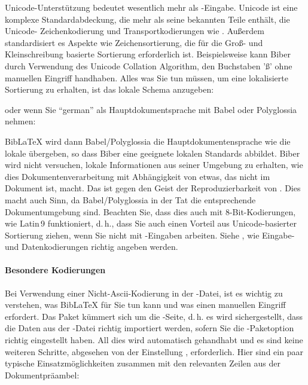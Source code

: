 \documentclass{ltxdockit}[2011/03/25]
\newcommand*{\biber}{Biber\xspace}
\newcommand*{\biblatex}{BibLaTeX\xspace}
\begin{document}
Unicode-Unterstützung bedeutet wesentlich mehr als \utf-Eingabe. Unicode ist
eine komplexe Standardabdeckung, die mehr als seine bekannten Teile enthält, die
Unicode- Zeichenkodierung und Transportkodierungen wie \utf. Außerdem
standardisiert es Aspekte wie Zeichensortierung, die für die Groß- und
Kleinschreibung basierte Sortierung erforderlich ist. Beispielsweise kann Biber
durch Verwendung des Unicode Collation Algorithm, den Buchstaben 'ß' ohne manuellen Eingriff handhaben. Alles was Sie
tun müssen, um eine lokalisierte Sortierung zu erhalten, ist das lokale
Schema anzugeben:

\begin{ltxexample}
\usepackage[sortlocale=de]{biblatex}
\end{ltxexample}
%
oder wenn Sie "`german"' als Hauptdokumentsprache mit Babel oder Polyglossia nehmen:

\begin{ltxexample}
\usepackage[sortlocale=auto]{biblatex}
\end{ltxexample}
%
\biblatex wird dann  Babel/Polyglossia die Hauptdokumentensprache wie die lokale übergeben, so dass \biber eine geeignete lokalen Standards abbildet. \biber wird nicht versuchen, lokale Informationen aus seiner Umgebung zu erhalten, wie dies Dokumentenverarbeitung mit Abhängigkeit von etwas, das nicht im Dokument ist, macht. 
Das ist gegen den Geist der Reproduzierbarkeit von \tex. Dies macht auch Sinn, da
Babel/Polyglossia in der Tat die entsprechende Dokumentumgebung sind.
Beachten Sie, dass dies auch mit
8-Bit-Kodierungen, wie Latin\,9 funktioniert, d.\,h., dass Sie auch einen
Vorteil aus Unicode-basierter Sortierung ziehen, wenn Sie nicht mit
\utf-Eingaben arbeiten. Siehe , wie Eingabe- und
Datenkodierungen richtig angeben werden.

\paragraph{Besondere Kodierungen} \label{bib:cav:enc:enc}

Bei Verwendung einer Nicht-Ascii-Kodierung in der -Datei, ist es
wichtig zu verstehen, was \biblatex für Sie tun kann und was einen
manuellen Eingriff erfordert. Das Paket kümmert sich um die \latex-Seite, d.\,h.
es wird sichergestellt, dass die Daten aus der -Datei richtig
importiert werden, sofern Sie die -Paketoption richtig
eingestellt haben. All dies wird 
automatisch gehandhabt und es sind keine weiteren Schritte, abgesehen von der
Einstellung , erforderlich. Hier sind ein paar typische
Einsatzmöglichkeiten zusammen mit den relevanten Zeilen aus der
Dokumentpräambel:
\end{document}
